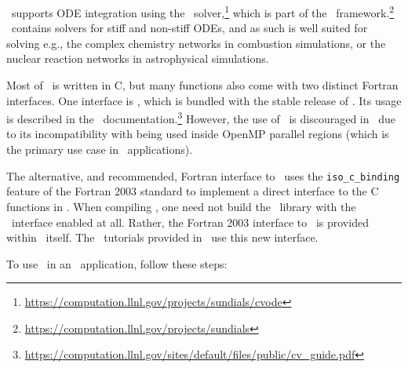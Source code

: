\amrex\ supports ODE integration using the \cvode\ solver,\footnote{\url{https://computation.llnl.gov/projects/sundials/cvode}} which is part of the \sundials\ framework.\footnote{\url{https://computation.llnl.gov/projects/sundials}}
\cvode\ contains solvers for stiff and non-stiff ODEs, and as such is well suited for solving e.g., the complex chemistry networks in combustion simulations, or the nuclear reaction networks in astrophysical simulations.

Most of \cvode\ is written in C, but many functions also come with two distinct Fortran interfaces.
One interface is \fcvode, which is bundled with the stable release of \cvode.
Its usage is described in the \cvode\ documentation.\footnote{\url{https://computation.llnl.gov/sites/default/files/public/cv_guide.pdf}}
However, the use of \fcvode\ is discouraged in \amrex\ due to its incompatibility with being used inside OpenMP parallel regions (which is the primary use case in \amrex\ applications).

The alternative, and recommended, Fortran interface to \cvode\ uses the \texttt{iso\_c\_binding} feature of the Fortran 2003 standard to implement a direct interface to the C functions in \cvode.
When compiling \cvode, one need not build the \cvode\ library with the \fcvode\ interface enabled at all.
Rather, the Fortran 2003 interface to \cvode\ is provided within \amrex\ itself.
The \cvode\ tutorials provided in \amrex\ use this new interface.

To use \cvode\ in an \amrex\ application, follow these steps:

